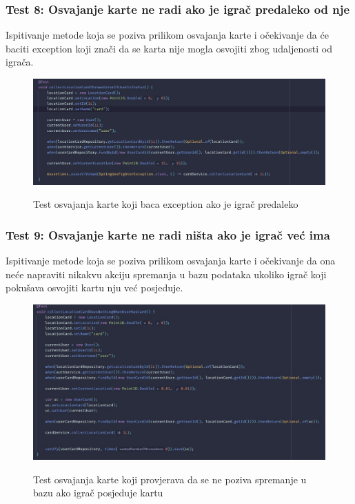 			\subsubsection{Test 8: Osvajanje karte ne radi ako je igrač predaleko od nje}
			Ispitivanje metode koja se poziva prilikom osvajanja karte i očekivanje da će baciti exception koji znači da se karta nije mogla osvojiti zbog udaljenosti od igrača.
			
			\begin{figure}[H]
				\centering
				\includegraphics[scale=0.55]{slike/test8} \\
				\caption{ Test osvajanja karte koji baca exception ako je igrač predaleko }
				\label{fig:test8}
			\end{figure}
		
			\subsubsection{Test 9: Osvajanje karte ne radi ništa ako je igrač već ima}
			Ispitivanje metode koja se poziva prilikom osvajanja karte i očekivanje da ona neće napraviti nikakvu akciju spremanja u bazu podataka ukoliko igrač koji pokušava osvojiti kartu nju već posjeduje.
			
			\begin{figure}[H]
				\centering
				\includegraphics[scale=0.55]{slike/test9} \\
				\caption{ Test osvajanja karte koji provjerava da se ne poziva spremanje u bazu ako igrač posjeduje kartu}
				\label{fig:test9}
			\end{figure}
		
